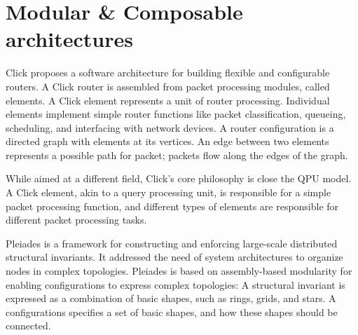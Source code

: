 


\section{Modular \& Composable architectures}
\label{sec:modular_arch}
Click \cite{kohler:click} proposes a software architecture for building flexible and configurable routers.
A Click router is assembled from packet processing modules, called elements.
A Click element represents a unit of router processing.
Individual elements implement simple router functions like packet classification, queueing, scheduling, and interfacing with network devices.
A router configuration is a directed graph with elements at its vertices.
An edge between two elements represents a possible path for packet; packets flow along the edges of the graph.

While aimed at a different field, Click's core philosophy is close the QPU model.
A Click element, akin to a query processing unit, is responsible for a simple packet processing function,
and different types of elements are responsible for different packet processing tasks.

Pleiades \cite{bouget:pleiades} is a framework for constructing and enforcing large-scale distributed structural invariants.
It addressed the need of system architectures to organize nodes in complex topologies.
Pleiades is based on assembly-based modularity for enabling configurations to express complex topologies:
A structural invariant is expressed as a combination of basic shapes, such as rings, grids, and stars.
A configurations specifies a set of basic shapes, and how these shapes should be connected.


